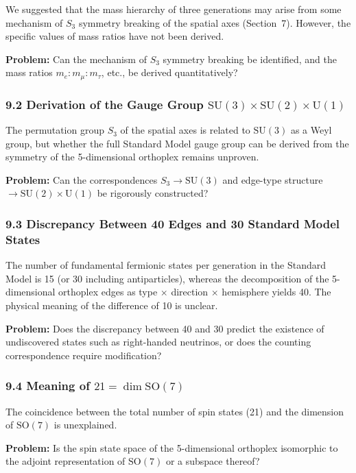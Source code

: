 \documentclass[a4paper,11pt]{article}
\begin{document}
We suggested that the mass hierarchy of three generations may arise from some mechanism of $S_3$ symmetry breaking of the spatial axes (Section~7). However, the specific values of mass ratios have not been derived.

\textbf{Problem:} Can the mechanism of $S_3$ symmetry breaking be identified, and the mass ratios $m_e : m_\mu : m_\tau$, etc., be derived quantitatively?

\subsubsection*{9.2 Derivation of the Gauge Group $\mathrm{SU}(3) \times \mathrm{SU}(2) \times \mathrm{U}(1)$}

The permutation group $S_3$ of the spatial axes is related to $\mathrm{SU}(3)$ as a Weyl group, but whether the full Standard Model gauge group can be derived from the symmetry of the 5-dimensional orthoplex remains unproven.

\textbf{Problem:} Can the correspondences $S_3 \to \mathrm{SU}(3)$ and edge-type structure $\to \mathrm{SU}(2) \times \mathrm{U}(1)$ be rigorously constructed?

\subsubsection*{9.3 Discrepancy Between 40 Edges and 30 Standard Model States}

The number of fundamental fermionic states per generation in the Standard Model is 15 (or 30 including antiparticles), whereas the decomposition of the 5-dimensional orthoplex edges as type $\times$ direction $\times$ hemisphere yields 40. The physical meaning of the difference of 10 is unclear.

\textbf{Problem:} Does the discrepancy between 40 and 30 predict the existence of undiscovered states such as right-handed neutrinos, or does the counting correspondence require modification?

\subsubsection*{9.4 Meaning of $21 = \dim \mathrm{SO}(7)$}

The coincidence between the total number of spin states (21) and the dimension of $\mathrm{SO}(7)$ is unexplained.

\textbf{Problem:} Is the spin state space of the 5-dimensional orthoplex isomorphic to the adjoint representation of $\mathrm{SO}(7)$ or a subspace thereof?
\end{document}
